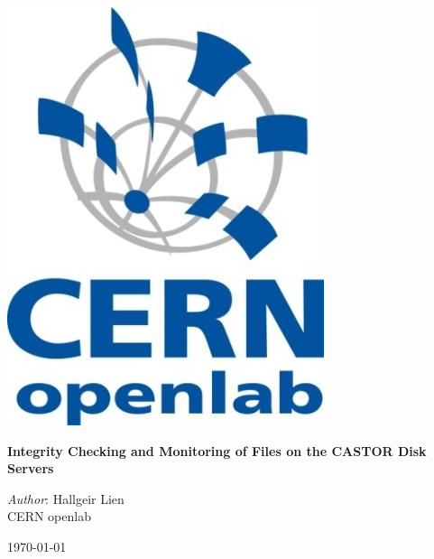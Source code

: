 
\thispagestyle{empty}

\begin{minipage}{1\textwidth}
\vspace{4cm}
\end{minipage}

\begin{minipage}{0.4\textwidth}
\begin{flushleft}
\includegraphics[width=\textwidth]{gfx/openlab-logo} 
\end{flushleft}
\end{minipage}
\begin{minipage}{0.6\textwidth}
\begin{flushright}
{\fontsize{30}{30}\selectfont \bf Integrity Checking and Monitoring of Files on the CASTOR Disk Servers}
\end{flushright}
\end{minipage}

\begin{flushright}
\huge
{\it Author}: Hallgeir Lien\\[1cm]
CERN openlab

\dmyyyydate \today

\end{flushright}

\newpage

